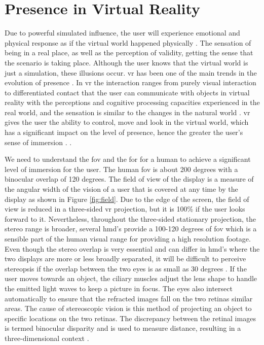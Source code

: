 \section{Presence in Virtual Reality} 
Due to powerful simulated influence, the user will experience emotional and physical response as if the virtual world happened physically \citep{Waterworth2014}. The sensation of being in a real place, as well as the perception of validity, getting the sense that the scenario is taking place. Although the user knows that the virtual world is just a simulation, these illusions occur. \acrshort{vr} has been one of the main trends in the evolution of presence \citep{Waterworth2014, Steinicke2016}. In
\acrlong{vr} the interaction ranges from purely visual interaction to differentiated contact that the user can communicate with objects in virtual reality with the perceptions and cognitive processing capacities experienced in the real world, and the sensation is similar to the changes in the natural world \citep{Hu2016}.
\acrshort{vr} gives the user the ability to control, move and look in the virtual world, which has a significant impact on the level of presence, hence the greater the user's sense of immersion \citep{William}. \cite[p.4]{Waterworth2014}.


We need to understand the \acrfull{fov} and the \acrfull{for} for a human to achieve a significant level of immersion for the user. The human \acrshort{fov} is about 200 degrees with a binocular overlap of 120 degrees. The field of view of the display is a measure of the angular width of the vision of a user that is covered at any time by the display as shown in Figure \ref{fig:field}. Due to the edge of the screen, the field of view is reduced in a three-sided \acrshort{vr} projection, but it is 100\% if the user looks forward to it. Nevertheless, throughout the three-sided stationary projection, the stereo range is broader, several \acrlong{hmd}'s provide a 100-120 degrees of \acrshort{fov} which is a sensible part of the human visual range for providing a high resolution footage. Even though the stereo overlap is very essential and can differ in \acrshort{hmd}'s where the two displays are more or less broadly separated, it will be difficult to perceive stereopsis if the overlap between the two eyes is as small as 30 degrees \citep{William}.
If the user moves towards an object, the ciliary muscles adjust the lens shape to handle the emitted light waves to keep a picture in focus. The eyes also intersect automatically to ensure that the refracted images fall on the two retinas similar areas. The cause of stereoscopic vision is this method of projecting an object to specific locations on the two retinas. The discrepancy between the retinal images is termed binocular disparity and is used to measure distance, resulting in a three-dimensional context \citep{Vince2011}.

